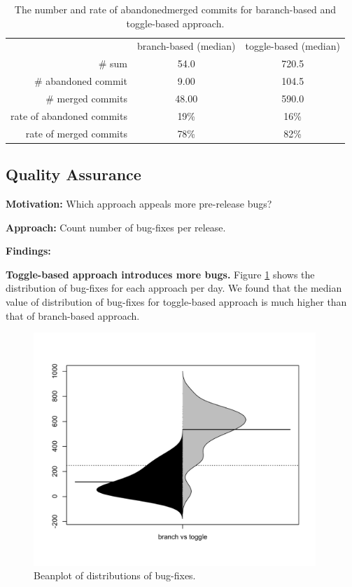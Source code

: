 \begin{table}
	\caption{The number and rate of abandoned\/merged commits for baranch-based and toggle-based approach.}
	\label{tab:abandonedMergedCommits}
	\begin{tabular}{r|c|c}
			& branch-based (median) & toggle-based (median) \\
		\# sum & 54.0 & 720.5 \\
		\# abandoned commit & 9.00 & 104.5 \\
		\# merged commits & 48.00 & 590.0 \\
		rate of abandoned commits & 19\% & 16\% \\
		rate of merged commits & 78\% & 82\% \\
	\end{tabular}
\end{table}





\subsection{Quality Assurance}

\textbf{Motivation:}
Which approach appeals more pre-release bugs?

\textbf{Approach:}
Count number of bug-fixes per release.

\textbf{Findings:} 

\textbf{Toggle-based approach introduces more bugs.} Figure \ref{fig:bug} shows the distribution of bug-fixes for each approach per day. We found that the median value of distribution of bug-fixes for toggle-based approach is much higher than that of branch-based approach.

\begin{figure}
\includegraphics[width=0.95\textwidth]{figure/beforeAfterBug.pdf}
\caption{Beanplot of distributions of bug-fixes.}
\label{fig:bug}
\end{figure}



